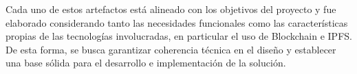 Cada uno de estos artefactos está alineado con los objetivos del proyecto y fue elaborado considerando tanto las necesidades funcionales como las características propias de las tecnologías involucradas, en particular el uso de Blockchain e IPFS. De esta forma, se busca garantizar coherencia técnica en el diseño y establecer una base sólida para el desarrollo e implementación de la solución.
